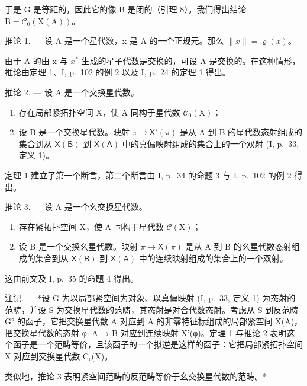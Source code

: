 于是 G 是等距的，因此它的像 B 是闭的（引理 8）。我们得出结论 \(\mathrm{B} = \mathcal{C}_{0}(\mathrm{X}(\mathrm{A}))\)。

推论 1. --- 设 A 是一个星代数，x 是 A 的一个正规元。那么 \(\|x\| = \varrho(x)\)。

由于 A 的由 x 与 \(x^{*}\) 生成的星子代数是交换的，可设 A 是交换的。在这种情形，推论由定理 1、I, p.~102 的例 2 以及 I, p.~24 的定理 1 得出。

推论 2. --- 设 A 是一个交换星代数。

\begin{enumerate}
\def\labelenumi{\alph{enumi})}
\item
  存在局部紧拓扑空间 X，使 A 同构于星代数 \(\mathcal{C}_{0}(\mathrm{X})\)；
\item
  设 B 是一个交换星代数。映射 \(\pi \mapsto \mathsf{X}'(\pi)\) 是从 A 到 B 的星代数态射组成的集合到从 \(\mathsf{X}(\mathsf{B})\) 到 \(\mathsf{X}(\mathsf{A})\) 中的真偏映射组成的集合上的一个双射 (I, p.~33, 定义 1)。
\end{enumerate}

定理 1 建立了第一个断言，第二个断言由 I, p.~34 的命题 3 与 I, p.~102 的例 2 得出。

推论 3. --- 设 A 是一个幺交换星代数。

\begin{enumerate}
\def\labelenumi{\alph{enumi})}
\item
  存在紧拓扑空间 X，使 A 同构于星代数 \(\mathcal{C}(\mathrm{X})\)；
\item
  设 B 是一个交换幺星代数。映射 \(\pi \mapsto \mathsf{X}(\pi)\) 是从 A 到 B 的幺星代数态射组成的集合到从 \(\mathsf{X}(\mathsf{B})\) 到 \(\mathsf{X}(\mathsf{A})\) 中的连续映射组成的集合上的一个双射。
\end{enumerate}

这由前文及 I, p.~35 的命题 4 得出。

注记. --- *设 G 为以局部紧空间为对象、以真偏映射 (I, p.~33, 定义 1) 为态射的范畴，并设 S 为交换星代数的范畴，其态射是对合代数态射。考虑从 S 到反范畴 G° 的函子，它把交换星代数 A 对应到 A 的非零特征标组成的局部紧空间 X(A)，把交换星代数的态射 φ: A → B 对应到连续映射 X'(φ)。定理 1 与推论 2 表明这个函子是一个范畴等价，且该函子的一个拟逆是这样的函子：它把局部紧拓扑空间 X 对应到交换星代数 C₀(X)。

类似地，推论 3 表明紧空间范畴的反范畴等价于幺交换星代数的范畴。*

